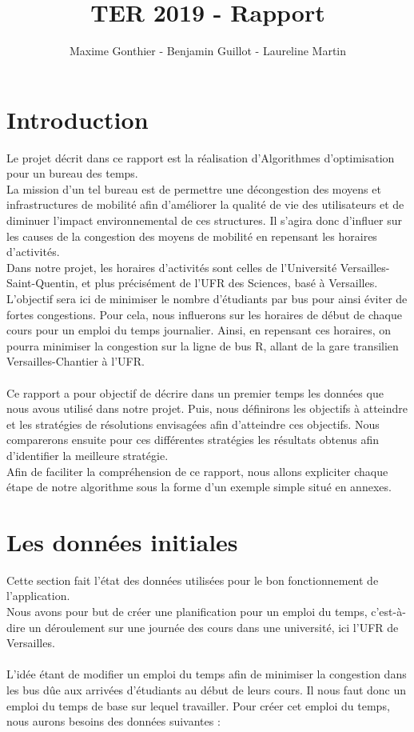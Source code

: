 \documentclass[a4paper,11pt]{article}
\title{TER 2019 - Rapport}
\author{Maxime Gonthier - Benjamin Guillot - Laureline Martin}
\begin{document}
\clearpage
\maketitle

\newpage
\tableofcontents

\newpage
\section{Introduction}
	Le projet décrit dans ce rapport est la réalisation d'Algorithmes d'optimisation pour un bureau des temps.\\
	La mission d'un tel bureau est de permettre une décongestion des moyens et infrastructures de mobilité afin d'améliorer la qualité de vie des utilisateurs et de diminuer l'impact environnemental de ces structures. Il s'agira donc d'influer sur les causes de la congestion des moyens de mobilité en repensant les horaires d'activités.\\
	Dans notre projet, les horaires d'activités sont celles de l'Université Versailles-Saint-Quentin, et plus précisément de l'UFR des Sciences, basé à Versailles. L'objectif sera ici de minimiser le nombre d'étudiants par bus pour ainsi éviter de fortes congestions. Pour cela, nous influerons sur les horaires de début de chaque cours pour un emploi du temps journalier. Ainsi, en repensant ces horaires, on pourra minimiser la congestion sur la ligne de bus R, allant de la gare transilien Versailles-Chantier à l'UFR.\\
	\\
	Ce rapport a pour objectif de décrire dans un premier temps les données que nous avous utilisé dans notre projet. Puis, nous définirons les objectifs à atteindre et les stratégies de résolutions envisagées afin d'atteindre ces objectifs. Nous comparerons ensuite pour ces différentes stratégies les résultats obtenus afin d'identifier la meilleure stratégie.\\
	Afin de faciliter la compréhension de ce rapport, nous allons expliciter chaque étape de notre algorithme sous la forme d'un exemple simple situé en annexes.
	
\section{Les données initiales}
	Cette section fait l'état des données utilisées pour le bon fonctionnement de l'application.\\
	Nous avons pour but de créer une planification pour un emploi du temps, c'est-à-dire un déroulement sur une journée des cours dans une université, ici l'UFR de Versailles.\\
	\\
	L'idée étant de modifier un emploi du temps afin de minimiser la congestion dans les bus dûe aux arrivées d'étudiants au début de leurs cours. Il nous faut donc un emploi du temps de base sur lequel travailler. Pour créer cet emploi du temps, nous aurons besoins des données suivantes : \\
\end{document}
